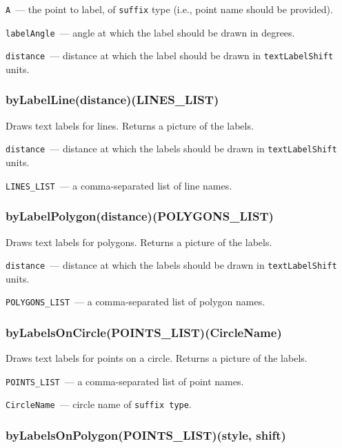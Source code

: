 	\texttt{A}~— the point to label, of \texttt{suffix} type (i.e., point name should be provided).
	
	\texttt{labelAngle}~— angle at which the label should be drawn in degrees.
	
	\texttt{distance}~— distance at which the label should be drawn in \texttt{textLabelShift} units.

\subsubsection{byLabelLine(distance)(LINES\_LIST)}\label{byLabelLine}
	
	Draws text labels for lines. Returns a picture of the labels.
	
	\texttt{distance}~— distance at which the labels should be drawn in \texttt{textLabelShift} units.
	
	\texttt{LINES\_LIST}~— a comma-separated list of line names.

\subsubsection{byLabelPolygon(distance)(POLYGONS\_LIST)}\label{byLabelPolygon}
	
	Draws text labels for polygons. Returns a picture of the labels.
	
	\texttt{distance}~— distance at which the labels should be drawn in \texttt{textLabelShift} units.
	
	\texttt{POLYGONS\_LIST}~— a comma-separated list of polygon names.


\subsubsection{byLabelsOnCircle(POINTS\_LIST)(CircleName)}\label{byLabelsOnCircle}
	
	Draws text labels for points on a circle. Returns a picture of the labels.
	
	\texttt{POINTS\_LIST}~— a comma-separated list of point names.
	
	\texttt{CircleName}~— circle name of \texttt{suffix type}.

\subsubsection{byLabelsOnPolygon(POINTS\_LIST)(style, shift)}\label{byLabelsOnPolygon}
	

